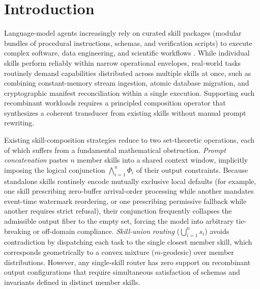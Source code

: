 \documentclass[11pt]{article}
\theoremstyle{definition}
\theoremstyle{plain}
\newcommand{\Mcal}{\mathcal{M}}
\newcommand{\Gfrak}{\mathfrak{G}}
\begin{document}
\begin{abstract}
while a read-only post-dominator verification gate breaks the Data Processing Inequality of pure-prompt chains. Across seven concrete task families evaluated with one isolated agent call per task and regime, $\Gfrak_{\Mcal}$ achieves a $98.71/100$ mean double-blind judge score, a $100.0\%$ ($7/7$) exogenous verification pass rate, and $7/7$ blind first-place wins over prompt concatenation ($87.27/100$, $0/7$ wins) and skill-union routing ($53.66/100$, $0/7$ wins).
\end{abstract}

\section{Introduction}
\label{sec:intro}

Language-model agents increasingly rely on curated skill packages (modular bundles of procedural instructions, schemas, and verification scripts) to execute complex software, data engineering, and scientific workflows \citep{schick2023toolformer,yao2023react,wang2024voyager}. While individual skills perform reliably within narrow operational envelopes, real-world tasks routinely demand capabilities distributed across multiple skills at once, such as combining constant-memory stream ingestion, atomic database migration, and cryptographic manifest reconciliation within a single execution. Supporting such recombinant workloads requires a principled composition operator that synthesizes a coherent transducer from existing skills without manual prompt rewriting.

Existing skill-composition strategies reduce to two set-theoretic operations, each of which suffers from a fundamental mathematical obstruction. \emph{Prompt concatenation} pastes $n$ member skills into a shared context window, implicitly imposing the logical conjunction $\bigwedge_{i=1}^n \Phi_i$ of their output constraints. Because standalone skills routinely encode mutually exclusive local defaults (for example, one skill prescribing zero-buffer arrival-order processing while another mandates event-time watermark reordering, or one prescribing permissive fallback while another requires strict refusal), their conjunction frequently collapses the admissible output fiber to the empty set, forcing the model into arbitrary tie-breaking or off-domain compliance. \emph{Skill-union routing} ($\bigcup_{i=1}^n s_i$) avoids contradiction by dispatching each task to the single closest member skill, which corresponds geometrically to a convex mixture ($m$-geodesic) over member distributions. However, any single-skill router has zero support on recombinant output configurations that require simultaneous satisfaction of schemas and invariants defined in distinct member skills.
\end{document}
